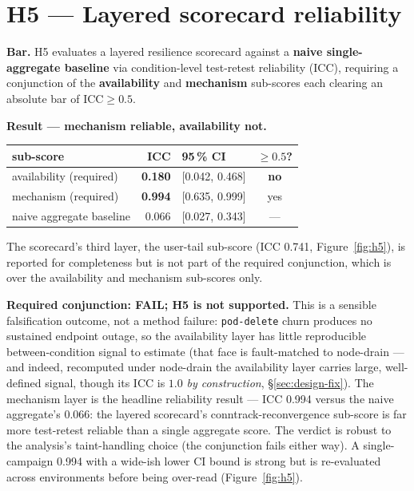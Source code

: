 \section{H5 --- Layered scorecard reliability}\label{sec:h5}

\textbf{Bar.} H5 evaluates a layered resilience scorecard against a
\textbf{naive single-aggregate baseline} via condition-level test-retest
reliability (ICC), requiring a conjunction of the \textbf{availability} and
\textbf{mechanism} sub-scores each clearing an absolute bar of $\text{ICC}\geq
0.5$.

\textbf{Result --- mechanism reliable, availability not.}

\begin{center}
\begin{tabular}{lrlc}
\toprule
sub-score & ICC & 95\,\% CI & $\geq 0.5$? \\
\midrule
availability (required) & \textbf{0.180} & [0.042, 0.468] & \textbf{no} \\
mechanism (required) & \textbf{0.994} & [0.635, 0.999] & yes \\
naive aggregate baseline & 0.066 & [0.027, 0.343] & --- \\
\bottomrule
\end{tabular}
\end{center}

The scorecard's third layer, the user-tail sub-score (ICC 0.741,
Figure~\ref{fig:h5}), is reported for completeness but is not part of the
required conjunction, which is over the availability and mechanism
sub-scores only.

\textbf{Required conjunction: FAIL; H5 is not supported.} This is a sensible
falsification outcome, not a method failure: \texttt{pod-delete} churn
produces no sustained endpoint outage, so the availability layer has little
reproducible between-condition signal to estimate (that face is fault-matched
to node-drain --- and indeed, recomputed under node-drain the availability layer
carries large, well-defined signal, though its ICC is $1.0$ \emph{by
construction}, \S\ref{sec:design-fix}). The mechanism layer is the headline reliability result --- ICC
0.994 versus the naive aggregate's 0.066: the layered scorecard's
conntrack-reconvergence sub-score is far more test-retest reliable than a single
aggregate score. The verdict is robust to the analysis's taint-handling choice
(the conjunction fails either way). A single-campaign 0.994 with a wide-ish
lower CI bound is strong but is re-evaluated across environments before being
over-read (Figure~\ref{fig:h5}).

